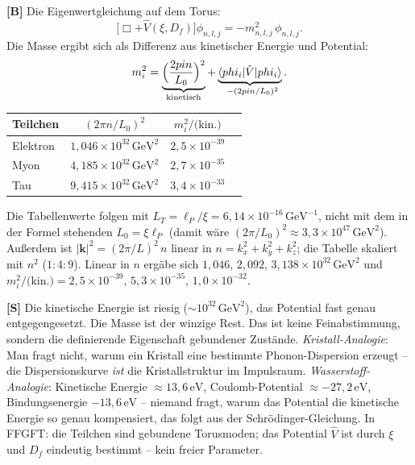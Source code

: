 \textbf{[B]} Die Eigenwertgleichung auf dem Torus:
\[
  \bigl[\Box + \hat V(\xi,D_f)\bigr]\phi_{n,l,j} = -m_{n,l,j}^2\,\phi_{n,l,j}.
\]
Die Masse ergibt sich als Differenz aus kinetischer Energie und Potential:
\[
  m_i^2
  = \underbrace{\Bigl(\frac{2\pi n}{L_0}\Bigr)^2}_{\text{kinetisch}}
  + \underbrace{\langle\phi_i|\hat V|\phi_i\rangle}_{\approx\,-(2\pi n/L_0)^2}.
\]

\begin{center}
\renewcommand{\arraystretch}{1.3}
{\small
\begin{tabular}{lccc}
\toprule
Teilchen & $(2\pi n/L_0)^2$ & $m_i^2/\text{(kin.)}$ \\
\midrule
Elektron & $1{,}046\times10^{32}\,\text{GeV}^2$ & $2{,}5\times10^{-39}$ \\
Myon     & $4{,}185\times10^{32}\,\text{GeV}^2$ & $2{,}7\times10^{-35}$ \\
Tau      & $9{,}415\times10^{32}\,\text{GeV}^2$ & $3{,}4\times10^{-33}$ \\
\bottomrule
\end{tabular}
}
\renewcommand{\arraystretch}{1.0}
\end{center}
Die Tabellenwerte folgen mit $L_T=\ell_P/\xi=6{,}14\times10^{-16}\,\text{GeV}^{-1}$, nicht mit dem in der Formel stehenden $L_0=\xi\ell_P$ (damit wäre $(2\pi/L_0)^2\approx3{,}3\times10^{47}\,\text{GeV}^2$). Außerdem ist $|\mathbf k|^2=(2\pi/L)^2\,n$ linear in $n=k_x^2+k_y^2+k_z^2$; die Tabelle skaliert mit $n^2$ ($1:4:9$). Linear in $n$ ergäbe sich $1{,}046$, $2{,}092$, $3{,}138\times10^{32}\,\text{GeV}^2$ und $m_i^2/\text{(kin.)}=2{,}5\times10^{-39}$, $5{,}3\times10^{-35}$, $1{,}0\times10^{-32}$.

\textbf{[S]} Die kinetische Energie ist riesig ($\sim10^{32}\,\text{GeV}^2$),
das Potential fast genau entgegengesetzt. Die Masse ist der winzige Rest. Das
ist keine Feinabstimmung, sondern die definierende Eigenschaft gebundener
Zustände. \emph{Kristall-Analogie}: Man fragt nicht, warum ein Kristall eine
bestimmte Phonon-Dispersion erzeugt -- die Dispersionskurve \emph{ist} die
Kristallstruktur im Impulsraum. \emph{Wasserstoff-Analogie}: Kinetische Energie
$\approx13{,}6\,\text{eV}$, Coulomb-Potential $\approx-27{,}2\,\text{eV}$,
Bindungsenergie $-13{,}6\,\text{eV}$ -- niemand fragt, warum das Potential die
kinetische Energie so genau kompensiert, das folgt aus der Schrödinger-Gleichung.
In FFGFT: die Teilchen sind gebundene Torusmoden; das Potential $\hat V$ ist
durch $\xi$ und $D_f$ eindeutig bestimmt -- kein freier Parameter.

